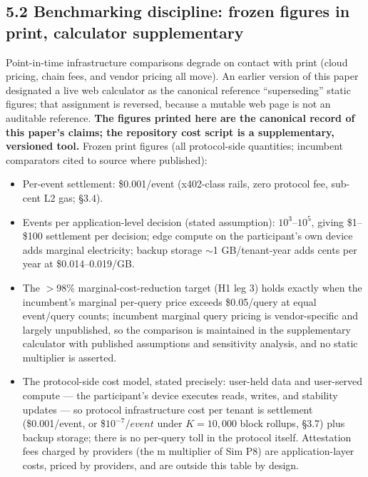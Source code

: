\documentclass[11pt,twocolumn]{article}
\providecommand{\tightlist}{\setlength{\itemsep}{0pt}\setlength{\parskip}{0pt}}
\begin{document}
\subsection*{5.2 Benchmarking discipline: frozen figures in print,
calculator
supplementary}

Point-in-time infrastructure comparisons degrade on contact with print
(cloud pricing, chain fees, and vendor pricing all move). An earlier
version of this paper designated a live web calculator
as the canonical reference ``superseding'' static
figures; that assignment is reversed, because a mutable web page
is not an auditable reference. \textbf{The figures
printed here are the canonical record of this paper's claims; the
repository cost script is a supplementary, versioned tool.} Frozen print figures
(all protocol-side quantities; incumbent comparators cited to source
where published):

\begin{itemize}
\tightlist
\item
  Per-event settlement: \$0.001/event (x402-class rails, zero protocol
  fee, sub-cent L2 gas; §3.4).
\item
  Events per application-level decision (stated assumption):
  \(10^{3}–10^{5}\), giving \$1--\$100 settlement per decision; edge
  compute on the participant's own device adds marginal electricity;
  backup storage $\sim$1 GB/tenant-year adds cents per year at
  \$0.014--0.019/GB.
\item
  The \(>\)98\% marginal-cost-reduction target (H1 leg 3) holds
  exactly when the incumbent's marginal per-query price exceeds
  \$0.05/query at equal event/query counts; incumbent marginal query
  pricing is vendor-specific and largely unpublished, so the comparison
  is maintained in the supplementary calculator with published
  assumptions and sensitivity analysis, and no static multiplier is
  asserted.
\item
  The protocol-side cost model, stated precisely: user-held data and
  user-served compute --- the participant's device executes reads,
  writes, and stability updates --- so protocol infrastructure cost per
  tenant is settlement (\$0.001/event, or \$\(10^{-7}/event\) under
  \(K = 10,000\) block rollups, §3.7) plus backup storage; there is no
  per-query toll in the protocol itself. Attestation fees charged by
  providers (the m multiplier of Sim P8) are application-layer costs,
  priced by providers, and are outside this table by design.
\end{itemize}
\end{document}
